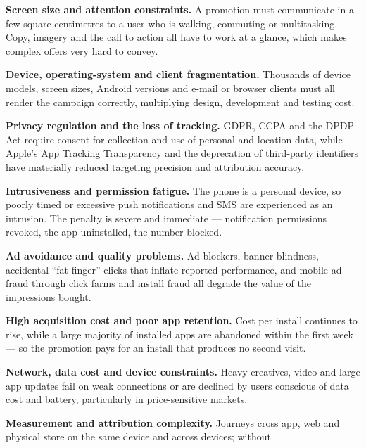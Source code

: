 \begin{qlist}
\begin{apts}
\item \textbf{Screen size and attention constraints.} A promotion must
      communicate in a few square centimetres to a user who is walking,
      commuting or multitasking. Copy, imagery and the call to action all have
      to work at a glance, which makes complex offers very hard to convey.
\item \textbf{Device, operating-system and client fragmentation.} Thousands of
      device models, screen sizes, Android versions and e-mail or browser
      clients must all render the campaign correctly, multiplying design,
      development and testing cost.
\item \textbf{Privacy regulation and the loss of tracking.} GDPR, CCPA and the
      DPDP Act require consent for collection and use of personal and location
      data, while Apple's App Tracking Transparency and the deprecation of
      third-party identifiers have materially reduced targeting precision and
      attribution accuracy.
\item \textbf{Intrusiveness and permission fatigue.} The phone is a personal
      device, so poorly timed or excessive push notifications and SMS are
      experienced as an intrusion. The penalty is severe and immediate ---
      notification permissions revoked, the app uninstalled, the number
      blocked.
\item \textbf{Ad avoidance and quality problems.} Ad blockers, banner
      blindness, accidental ``fat-finger'' clicks that inflate reported
      performance, and mobile ad fraud through click farms and install fraud
      all degrade the value of the impressions bought.
\item \textbf{High acquisition cost and poor app retention.} Cost per install
      continues to rise, while a large majority of installed apps are abandoned
      within the first week --- so the promotion pays for an install that
      produces no second visit.
\item \textbf{Network, data cost and device constraints.} Heavy creatives,
      video and large app updates fail on weak connections or are declined by
      users conscious of data cost and battery, particularly in price-sensitive
      markets.
\item \textbf{Measurement and attribution complexity.} Journeys cross app, web
      and physical store on the same device and across devices; without

\end{apts}
\end{qlist}
